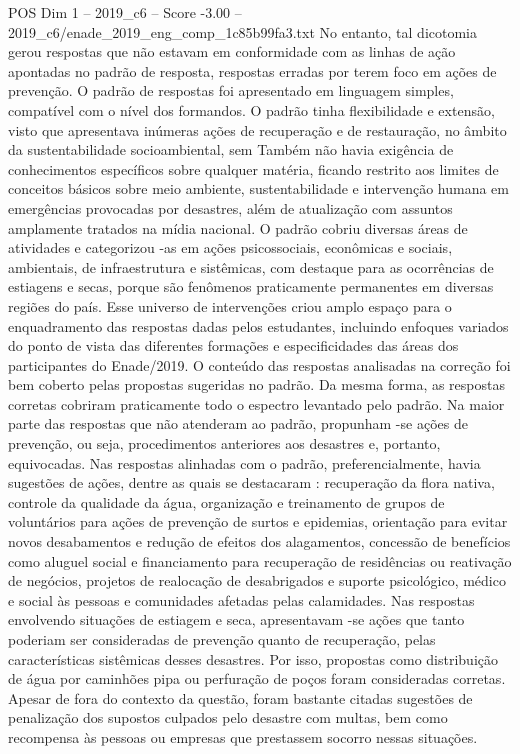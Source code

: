 \begin{textsample}{POS Dim 1 – 2019\_c6 – Score -3.00 – 2019\_c6/enade\_2019\_eng\_comp\_1c85b99fa3.txt}
No entanto, tal dicotomia gerou respostas que não estavam em conformidade com as linhas de ação apontadas no padrão de resposta, respostas erradas por terem foco em ações de prevenção.
O padrão de respostas foi apresentado em linguagem simples, compatível com o nível dos formandos.
O padrão tinha flexibilidade e extensão, visto que apresentava inúmeras ações de recuperação e de restauração, no âmbito da sustentabilidade socioambiental, sem Também não havia exigência de conhecimentos específicos sobre qualquer matéria, ficando restrito aos limites de conceitos básicos sobre meio ambiente, sustentabilidade e intervenção humana em emergências provocadas por desastres, além de atualização com assuntos amplamente tratados na mídia nacional.
O padrão cobriu diversas áreas de atividades e categorizou -as em ações psicossociais, econômicas e sociais, ambientais, de infraestrutura e sistêmicas, com destaque para as ocorrências de estiagens e secas, porque são fenômenos praticamente permanentes em diversas regiões do país.
Esse universo de intervenções criou amplo espaço para o enquadramento das respostas dadas pelos estudantes, incluindo enfoques variados do ponto de vista das diferentes formações e especificidades das áreas dos participantes do Enade/2019.
O conteúdo das respostas analisadas na correção foi bem coberto pelas propostas sugeridas no padrão.
Da mesma forma, as respostas corretas cobriram praticamente todo o espectro levantado pelo padrão.
Na maior parte das respostas que não atenderam ao padrão, propunham -se ações de prevenção, ou seja, procedimentos anteriores aos desastres e, portanto, equivocadas.
Nas respostas alinhadas com o padrão, preferencialmente, havia sugestões de ações, dentre as quais se destacaram : recuperação da flora nativa, controle da qualidade da água, organização e treinamento de grupos de voluntários para ações de prevenção de surtos e epidemias, orientação para evitar novos desabamentos e redução de efeitos dos alagamentos, concessão de benefícios como aluguel social e financiamento para recuperação de residências ou reativação de negócios, projetos de realocação de desabrigados e suporte psicológico, médico e social às pessoas e comunidades afetadas pelas calamidades.
Nas respostas envolvendo situações de estiagem e seca, apresentavam -se ações que tanto poderiam ser consideradas de prevenção quanto de recuperação, pelas características sistêmicas desses desastres.
Por isso, propostas como distribuição de água por caminhões pipa ou perfuração de poços foram consideradas corretas.
Apesar de fora do contexto da questão, foram bastante citadas sugestões de penalização dos supostos culpados pelo desastre com multas, bem como recompensa às pessoas ou empresas que prestassem socorro nessas situações.

\end{textsample}
